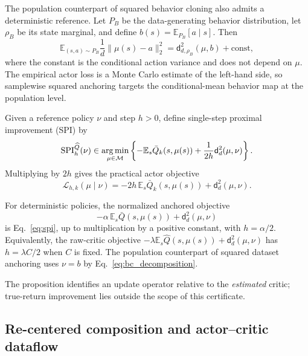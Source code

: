 The population counterpart of squared behavior cloning also admits a
deterministic reference. Let $P_{\!B}$ be the data-generating behavior
distribution, let $\rho_B$ be its state marginal, and define
$b(s)=\mathbb E_{P_{\!B}}[a\mid s]$. Then
\begin{equation}
 \mathbb E_{(s,a)\sim P_{\!B}}\frac{1}{d}\|\mu(s)-a\|_2^2
 =\mathsf d_{d,\rho_B}^2(\mu,b)+\mathrm{const},
 \label{eq:bc_decomposition}
\end{equation}
where the constant is the conditional action variance and does not depend on
$\mu$. The empirical actor loss is a Monte Carlo estimate of the left-hand
side, so samplewise squared anchoring targets the conditional-mean behavior map
at the population level.

Given a reference policy $\nu$ and step $h>0$, define single-step proximal
improvement (SPI) by
\begin{equation}
\operatorname{SPI}_{h}^{\widehat Q}(\nu)
\in\operatorname*{arg\,min}_{\mu\in\mathcal M}
\left\{-\mathbb E_s\bar Q_k(s,\mu(s))
+\frac{1}{2h}\mathsf d_d^2(\mu,\nu)\right\}.
\label{eq:spi}
\end{equation}
Multiplying by $2h$ gives the practical actor objective
\begin{equation}
\mathcal L_{h,k}(\mu\mid\nu)
=-2h\,\mathbb E_s\bar Q_k(s,\mu(s))
+\mathsf d_d^2(\mu,\nu).
\label{eq:actorloss}
\end{equation}

\begin{proposition}
\label{prop:spi_equiv}
For deterministic policies, the normalized anchored objective
\begin{equation*}
 -\alpha\,\mathbb E_s\bar Q(s,\mu(s))
 +\mathsf d_d^2(\mu,\nu)
\end{equation*}
is Eq.~\eqref{eq:spi}, up to multiplication by a positive constant, with
$h=\alpha/2$. Equivalently, the raw-critic objective
$-\lambda\mathbb E_s\widehat Q(s,\mu(s))+\mathsf d_d^2(\mu,\nu)$ has
$h=\lambda C/2$ when $C$ is fixed. The population counterpart of squared
dataset anchoring uses $\nu=b$ by Eq.~\eqref{eq:bc_decomposition}.
\end{proposition}

The proposition identifies an update operator relative to the \emph{estimated}
critic; true-return improvement lies outside the scope of this certificate.

\subsection{Re-centered composition and actor--critic dataflow}

